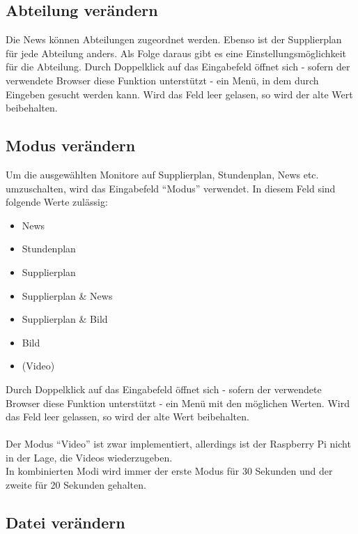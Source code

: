 \subsection{Abteilung verändern}

Die News können Abteilungen zugeordnet werden. Ebenso ist der Supplierplan für jede Abteilung anders. Als Folge daraus gibt es eine Einstellungsmöglichkeit für die Abteilung. Durch Doppelklick auf das Eingabefeld öffnet sich - sofern der verwendete Browser diese Funktion unterstützt - ein Menü, in dem durch Eingeben gesucht werden kann. Wird das Feld leer gelasen, so wird der alte Wert beibehalten.

\subsection{Modus verändern}

Um die ausgewählten Monitore auf Supplierplan, Stundenplan, News etc. umzuschalten, wird das Eingabefeld \enquote{Modus} verwendet. In diesem Feld sind folgende Werte zulässig:
\begin{itemize}
	\item News
	\item Stundenplan
	\item Supplierplan
	\item Supplierplan \& News
	\item Supplierplan \& Bild
	\item Bild
	\item (Video)
\end{itemize}
Durch Doppelklick auf das Eingabefeld öffnet sich - sofern der verwendete Browser diese Funktion unterstützt - ein Menü mit den möglichen Werten. Wird das Feld leer gelassen, so wird der alte Wert beibehalten.\\
\\
Der Modus \enquote{Video} ist zwar implementiert, allerdings ist der Raspberry Pi nicht in der Lage, die Videos wiederzugeben.\\
In kombinierten Modi wird immer der erste Modus für 30 Sekunden und der zweite für 20 Sekunden gehalten.

\subsection{Datei verändern}

